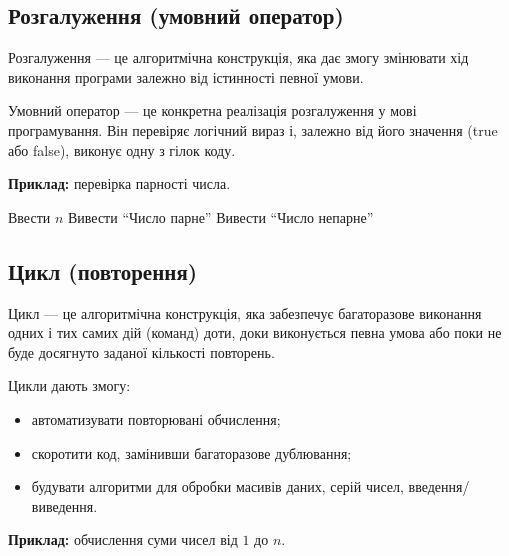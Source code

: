 	\subsection*{Розгалуження (умовний оператор)}
			\begin{defn}{Розгалуження — це}
	  алгоритмічна конструкція, яка дає змогу змінювати хід виконання програми залежно від істинності певної умови.
	\end{defn}
				\begin{defn}{	Умовний оператор — це}
	 конкретна реалізація розгалуження у мові програмування.
	Він перевіряє логічний вираз і, залежно від його значення (true або false), виконує одну з гілок коду.
	\end{defn}
	
  
	\textbf{Приклад:} перевірка парності числа.

	
	\begin{tcolorbox}[title=Алгоритм: Перевірка парності]

			\begin{algorithmic}
				\STATE Ввести $n$
				\STATE Вивести ``Число парне''
				\ELSE
				\STATE Вивести ``Число непарне''
				\ENDIF
			\end{algorithmic}

	\end{tcolorbox}
	
	\subsection*{Цикл (повторення)}
		\begin{defn}{Цикл — це}
	алгоритмічна конструкція, яка забезпечує багаторазове виконання одних і тих самих дій (команд) доти, доки виконується певна умова або поки не буде досягнуто заданої кількості повторень.
	\end{defn}
	

	Цикли дають змогу:
		\begin{itemize}
		\item		автоматизувати повторювані обчислення;
		\item 	скоротити код, замінивши багаторазове дублювання;
		\item 	будувати алгоритми для обробки масивів даних, серій чисел, введення/виведення.
	\end{itemize}
	
 
	\textbf{Приклад:} обчислення суми чисел від $1$ до $n$.

